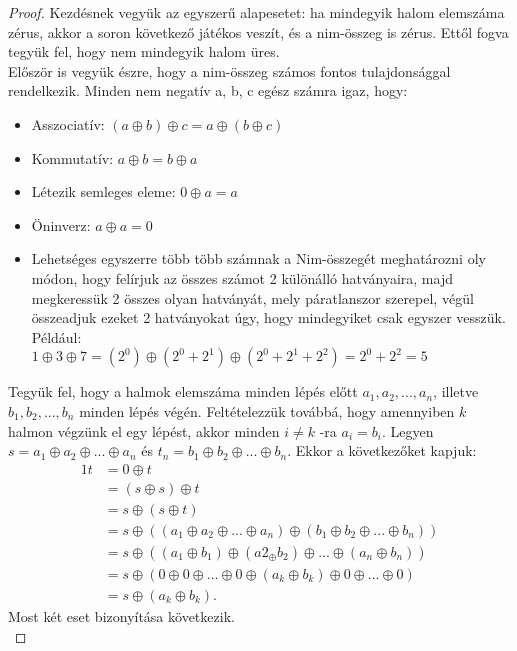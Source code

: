 \begin{proof}
Kezdésnek vegyük az egyszerű alapesetet: ha mindegyik halom elemszáma zérus, akkor a soron következő játékos veszít, és a nim-összeg is zérus. Ettől fogva tegyük fel, hogy nem mindegyik halom üres. \\

Először is vegyük észre, hogy a nim-összeg számos fontos tulajdonsággal rendelkezik. Minden nem negatív a, b, c egész számra igaz, hogy:
\begin{itemize}
	\item Asszociatív: $(a \oplus b) \oplus c = a \oplus (b \oplus c)$
	\item Kommutatív: $a \oplus b = b \oplus a$
	\item Létezik semleges eleme: $0 \oplus a = a$
	\item Öninverz: $a \oplus a = 0$
	\item Lehetséges egyszerre több több számnak a Nim-összegét meghatározni oly módon, hogy felírjuk az összes számot 2 különálló hatványaira, majd megkeressük 2 összes olyan hatványát, mely páratlanszor szerepel, végül összeadjuk ezeket 2 hatványokat úgy, hogy mindegyiket csak egyszer vesszük. Például: \\
	$1 \oplus 3 \oplus 7 = (2^0) \oplus (2^0 + 2^1) \oplus (2^0 + 2^1 + 2^2) = 2^0 + 2^2 = 5$
\end{itemize}

Tegyük fel, hogy a halmok elemszáma minden lépés előtt $a_1, a_2, ..., a_n$, illetve $b_1, b_2, ..., b_n$ minden lépés végén. Feltételezzük továbbá, hogy amennyiben $k$ halmon végzünk el egy lépést, akkor minden $i \neq k$ -ra $a_i = b_i$. Legyen $s = a_1 \oplus a_2 \oplus ... \oplus a_n$ és $t_n = b_1 \oplus b_2 \oplus ... \oplus b_n$. Ekkor a következőket kapjuk:
\begin{alignat*}{1}
	t &= 0 \oplus t \\
	&= (s \oplus s) \oplus t \\
	&= s \oplus (s \oplus t) \\
	&= s \oplus ((a_1 \oplus a_2 \oplus ... \oplus a_n) \oplus (b_1 \oplus b_2 \oplus ... \oplus b_n)) \\
	&= s \oplus ((a_1 \oplus b_1) \oplus (a2_ \oplus b_2) \oplus ... \oplus (a_n \oplus b_n)) \\
	&= s \oplus (0 \oplus 0 \oplus ... \oplus 0 \oplus (a_k \oplus b_k) \oplus 0 \oplus ... \oplus 0) \\
	&= s \oplus (a_k \oplus b_k).
\end{alignat*}
Most két eset bizonyítása következik. \\


\end{proof}
